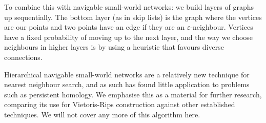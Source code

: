 To combine this with navigable small-world networks: we build layers of graphs up sequentially. The bottom layer (as in skip lists) is the graph where the vertices are our points and two points have an edge if they are an $\varepsilon$-neighbour. Vertices have a fixed probability of moving up to the next layer, and the way we choose neighbours in higher layers is by using a heuristic that favours diverse connections.

Hierarchical navigable small-world networks are a relatively new technique for nearest neighbour search, and as such has found little application to problems such as persistent homology. We emphasise this as a material for further research, comparing its use for Vietoris-Rips construction against other established techniques. We will not cover any more of this algorithm here. 

